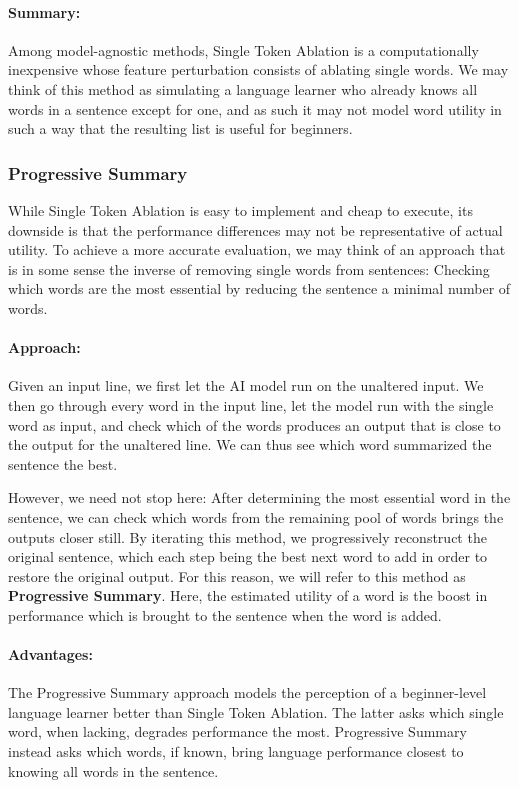 \paragraph{Summary:}
Among model-agnostic methods, Single Token Ablation is a computationally inexpensive whose feature perturbation consists of ablating single words.
We may think of this method as simulating a language learner who already knows all words in a sentence except for one, and as such it may not model word utility in such a way that the resulting list is useful for beginners.

\subsubsection{Progressive Summary}
While Single Token Ablation is easy to implement and cheap to execute, its downside is that the performance differences may not be representative of actual utility.
To achieve a more accurate evaluation, we may think of an approach that is in some sense the inverse of removing single words from sentences:
Checking which words are the most essential by reducing the sentence a minimal number of words.

\paragraph{Approach:}
Given an input line, we first let the AI model run on the unaltered input.
We then go through every word in the input line, let the model run with the single word as input, and check which of the words produces an output that is close to the output for the unaltered line.
We can thus see which word summarized the sentence the best.

However, we need not stop here:
After determining the most essential word in the sentence, we can check which words from the remaining pool of words brings the outputs closer still.
By iterating this method, we progressively reconstruct the original sentence, which each step being the best next word to add in order to restore the original output.
For this reason, we will refer to this method as \textbf{Progressive Summary}.
Here, the estimated utility of a word is the boost in performance which is brought to the sentence when the word is added.

\paragraph{Advantages:}
The Progressive Summary approach models the perception of a beginner-level language learner better than Single Token Ablation.
The latter asks which single word, when lacking, degrades performance the most.
Progressive Summary instead asks which words, if known, bring language performance closest to knowing all words in the sentence.

